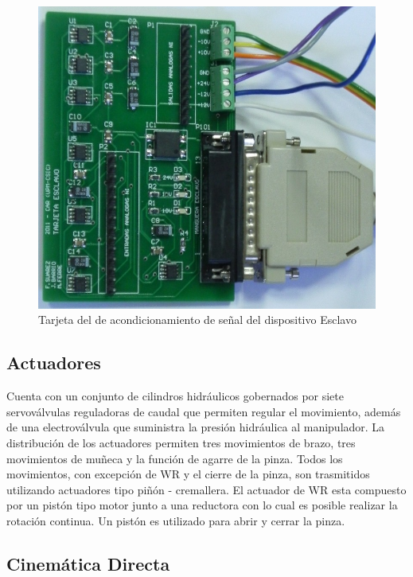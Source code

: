 \begin{figure}[htb!]
\centering
\includegraphics[scale=0.9]{FiguresP/TarjetaEsclavo}
\caption{Tarjeta del de acondicionamiento de señal del dispositivo Esclavo}
\label{fig:TarjetaEsclavo}
\end{figure}



\subsection*{Actuadores}
Cuenta con un conjunto de cilindros hidráulicos gobernados por  siete servoválvulas reguladoras de caudal que permiten regular el movimiento, además de una electroválvula que suministra la presión hidráulica al manipulador. La distribución de los actuadores permiten tres movimientos de brazo, tres movimientos de muñeca y la función de agarre de la pinza. Todos los movimientos, con excepción de WR y el cierre de la pinza, son trasmitidos utilizando actuadores tipo piñón - cremallera. El actuador de WR esta compuesto por un pistón tipo motor junto a una reductora con lo cual es posible realizar la rotación continua. Un pistón es utilizado para abrir y cerrar la pinza. 






\subsection{Cinemática Directa}


